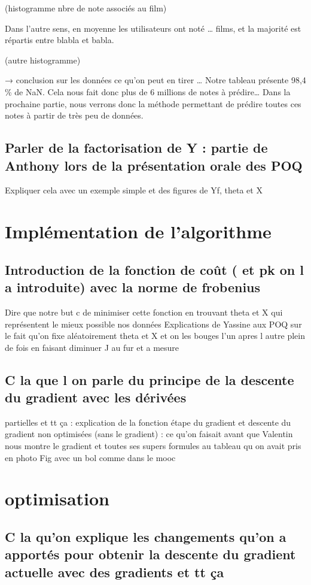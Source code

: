 \documentclass[a4paper,10pt]{article}
\begin{document}
(histogramme nbre de note associés au film)

Dans l’autre sens, en moyenne les utilisateurs ont noté … films, et la majorité est répartis entre blabla et babla.

(autre histogramme)

→ conclusion sur les données ce qu’on peut en tirer …
Notre tableau présente 98,4 \% de NaN. Cela nous fait donc plus de 6 millions de notes à prédire… Dans la prochaine partie, nous verrons donc la méthode permettant de prédire toutes ces notes à partir de très peu de données.

\subsection{Parler de la factorisation de Y : partie de Anthony lors de la présentation orale des POQ}
Expliquer cela avec un exemple simple et des figures de Yf, theta et X
\section{Implémentation de l’algorithme}
\subsection{Introduction de la fonction de coût ( et pk on l a introduite) avec la norme de frobenius}
Dire que notre but c de minimiser cette fonction en trouvant theta et X qui représentent le mieux possible nos données 
    Explications de Yassine aux POQ sur le fait qu’on fixe aléatoirement theta et X et on les bouges l'un apres l autre plein de fois en faisant diminuer J au fur et a mesure
\subsection{C la que l on parle du principe de la descente du gradient avec les dérivées}
partielles et tt ça : explication de la fonction étape du gradient et descente du gradient non optimisées (sans le gradient) : ce qu'on faisait avant que Valentin nous montre le gradient et toutes ses supers formules au tableau qu on avait pris en photo
Fig avec un bol comme dans le mooc
\section{optimisation}
\subsection{C la qu'on explique les changements qu'on a apportés pour obtenir la descente du gradient actuelle avec des gradients et tt ça}
\end{document}
